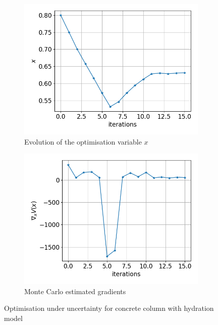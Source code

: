 \documentclass[a4paper,11pt]{article}
\begin{document}
\begin{figure}[!htpb]
	\centering
	\begin{subfigure}{0.45\textwidth}
		\includegraphics[width=\textwidth]{fig/x_evolution_stochastic_opt_wCOnstraints18_10_2022_13:06.png}
		\caption{Evolution of the optimisation variable $x$}
		\label{fig:para_opt_hydration}
	\end{subfigure}
	\hfill
	\begin{subfigure}{0.45\textwidth}
		\includegraphics[width=\textwidth]{fig/grad_stochastic_opt_constraints18_10_2022_13:06.png}
		\caption{Monte Carlo estimated gradients}
		\label{fig:grad_opt_hydration}
	\end{subfigure}
	\hfill
	\caption{Optimisation under uncertainty for concrete column with hydration model}
	\label{fig:opt_diagnostics_hydration}
\end{figure}
\end{document}
